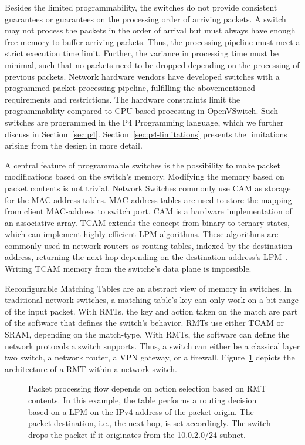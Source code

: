 Besides the limited programmability, the switches do not provide consistent guarantees or guarantees on the processing order of arriving packets. A switch may not process the packets in the order of arrival but must always have enough free memory to buffer arriving packets. Thus, the processing pipeline must meet a strict execution time limit. Further, the variance in processing time must be minimal, such that no packets need to be dropped depending on the processing of previous packets. Network hardware vendors have developed switches with a programmed packet processing pipeline, fulfilling the abovementioned requirements and restrictions. The hardware constraints limit the programmability compared to \ac{CPU} based processing in OpenVSwitch. Such switches are programmed in the P4 Programming language, which we further discuss in Section~\ref{sec:p4}. Section~\ref{sec:p4-limitations} presents the limitations arising from the design in more detail.

A central feature of programmable switches is the possibility to make packet modifications based on the switch's memory. Modifying the memory based on packet contents is not trivial.
Network Switches commonly use \ac{CAM} as storage for the \ac{MAC}-address tables. \ac{MAC}-address tables are used to store the mapping from client \ac{MAC}-address to switch port. \ac{CAM} is a hardware implementation of an associative array. \ac{TCAM} extends the concept from binary to ternary states, which can implement highly efficient \ac{LPM} algorithms. These algorithms are commonly used in network routers as routing tables, indexed by the destination address, returning the next-hop depending on the destination address's \ac{LPM}~\cite{pagiamtzisContentAddressableMemoryCAM2006}. Writing \ac{TCAM} memory from the switche's data plane is impossible.

Reconfigurable Matching Tables are an abstract view of memory in switches. In traditional network switches, a matching table's key can only work on a bit range of the input packet. With \acp{RMT}, the key and action taken on the match are part of the software that defines the switch's behavior. \acp{RMT} use either \ac{TCAM} or \ac{SRAM}, depending on the match-type. With \acp{RMT}, the software can define the network protocols a switch supports. Thus, a switch can either be a classical layer two switch, a network router, a \ac{VPN} gateway, or a firewall. Figure~\ref{fig:rmt} depicts the architecture of a \ac{RMT} within a network switch.
\begin{figure}[ht]
  \centering
  
  \caption{\label{fig:rmt} Packet processing flow depends on action selection based on \ac{RMT} contents. In this example, the table performs a routing decision based on a \ac{LPM} on the IPv4 address of the packet origin. The packet destination, i.e., the next hop, is set accordingly. The switch drops the packet if it originates from the 10.0.2.0/24 subnet.}
\end{figure}

